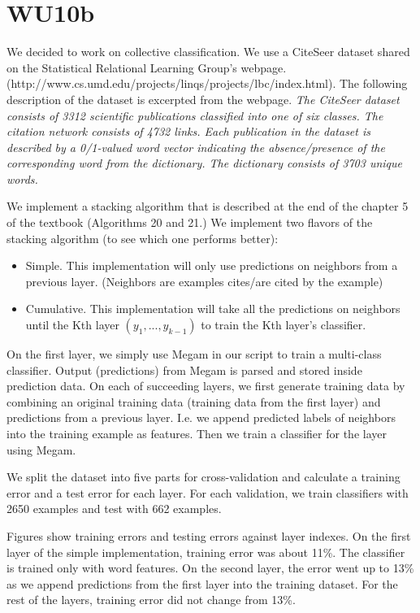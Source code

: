 \newpage
\section{WU10b}
We decided to work on collective classification. We use a CiteSeer dataset shared on the Statistical Relational Learning Group's webpage. (http://www.cs.umd.edu/projects/linqs/projects/lbc/index.html). The following description of the dataset is excerpted from the webpage. \textit{The CiteSeer dataset consists of 3312 scientific publications classified into one of six classes. The citation network consists of 4732 links. Each publication in the dataset is described by a 0/1-valued word vector indicating the absence/presence of the corresponding word from the dictionary. The dictionary consists of 3703 unique words.}

We implement a stacking algorithm that is described at the end of the chapter 5 of the textbook (Algorithms 20 and 21.) We implement two flavors of the stacking algorithm (to see which one performs better):
\begin{itemize}
	\item Simple. This implementation will only use predictions on neighbors from a previous layer. (Neighbors are examples cites/are cited by the example)
	\item Cumulative. This implementation will take all the predictions on neighbors until the Kth layer $(y_1, ..., y_{k-1})$ to train the Kth layer's classifier.
\end{itemize}
On the first layer, we simply use Megam in our script to train a multi-class classifier. Output (predictions) from Megam is parsed and stored inside prediction data. On each of succeeding layers, we first generate training data by combining an original training data (training data from the first layer) and predictions from a previous layer. I.e. we append predicted labels of neighbors into the training example as features. Then we train a classifier for the layer using Megam.

We split the dataset into five parts for cross-validation and calculate a training error and a test error for each layer. For each validation, we train classifiers with 2650 examples and test with 662 examples. 

Figures show training errors and testing errors against layer indexes. On the first layer of the simple implementation, training error was about 11\%. The classifier is trained only with word features. On the second layer, the error went up to 13\% as we append predictions from the first layer into the training dataset. For the rest of the layers, training error did not change from 13\%. 


